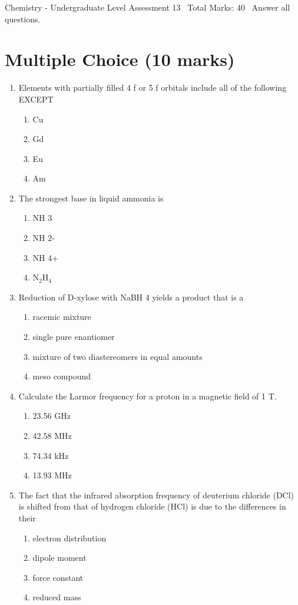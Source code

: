 \documentclass[12pt]{article}
\begin{document}
\begin{center}
Chemistry - Undergraduate Level Assessment 13 \
Total Marks: 40 \
Answer all questions.
\end{center}

\section*{Multiple Choice (10 marks)}
\begin{enumerate}[label=\arabic*.]
\item Elements with partially filled 4 f or 5 f orbitals include all of the following EXCEPT
\begin{enumerate}[label=(\alph*)]
    \item Cu
    \item Gd
    \item Eu
    \item Am
\end{enumerate}
\item The strongest base in liquid ammonia is
\begin{enumerate}[label=(\alph*)]
    \item NH 3
    \item NH 2-
    \item NH 4+
    \item N$_{2}$H$_{4}$
\end{enumerate}
\item Reduction of D-xylose with NaBH 4 yields a product that is a
\begin{enumerate}[label=(\alph*)]
    \item racemic mixture
    \item single pure enantiomer
    \item mixture of two diastereomers in equal amounts
    \item meso compound
\end{enumerate}
\item Calculate the Larmor frequency for a proton in a magnetic field of 1 T.
\begin{enumerate}[label=(\alph*)]
    \item 23.56 GHz
    \item 42.58 MHz
    \item 74.34 kHz
    \item 13.93 MHz
\end{enumerate}
\item The fact that the infrared absorption frequency of deuterium chloride (DCl) is shifted from that of hydrogen chloride (HCl) is due to the differences in their
\begin{enumerate}[label=(\alph*)]
    \item electron distribution
    \item dipole moment
    \item force constant
    \item reduced mass
\end{enumerate}
\end{enumerate}
\end{document}
